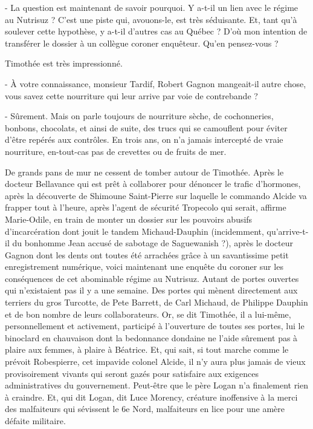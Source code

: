 - La question est maintenant de savoir pourquoi. Y a-t-il un lien avec le régime au Nutrisuz ? C’est une piste qui, avouons-le, est très séduisante. Et, tant qu’à soulever cette hypothèse, y a-t-il d’autres cas au Québec ? D’où mon intention de transférer le dossier à un collègue coroner enquêteur. Qu’en pensez-vous ?

Timothée est très impressionné.

- À votre connaissance, monsieur Tardif, Robert Gagnon mangeait-il autre chose, vous savez cette nourriture qui leur arrive par voie de contrebande ?

- Sûrement. Mais on parle toujours de nourriture sèche, de cochonneries, bonbons, chocolats, et ainsi de suite, des trucs qui se camouflent pour éviter d’être repérés aux contrôles. En trois ans, on n’a jamais intercepté de vraie nourriture, en-tout-cas pas de crevettes ou de fruits de mer.

De grands pans de mur ne cessent de tomber autour de Timothée. Après le docteur Bellavance qui est prêt à collaborer pour dénoncer le trafic d’hormones, après la découverte de Shimoune Saint-Pierre sur laquelle le commando Alcide va frapper tout à l’heure, après l’agent de sécurité Tropecolo qui serait, affirme Marie-Odile, en train de monter un dossier sur les pouvoirs abusifs d’incarcération dont jouit le tandem Michaud-Dauphin (incidemment, qu’arrive-t-il du bonhomme Jean accusé de sabotage de Saguewanish ?), après le docteur Gagnon dont les dents ont toutes été arrachées grâce à un savantissime petit enregistrement numérique, voici maintenant une enquête du coroner sur les conséquences de cet abominable régime au Nutrisuz. Autant de portes ouvertes qui n’existaient pas il y a une semaine. Des portes qui mènent directement aux terriers du gros Turcotte, de Pete Barrett, de Carl Michaud, de Philippe Dauphin et de bon nombre de leurs collaborateurs. Or, se dit Timothée, il a lui-même, personnellement et activement, participé à l’ouverture de toutes ses portes, lui le binoclard en chauvaison dont la bedonnance dondaine ne l’aide sûrement pas à plaire aux femmes, à plaire à Béatrice. Et, qui sait, si tout marche comme le prévoit Robespierre, cet impavide colonel Alcide, il n’y aura plus jamais de vieux provisoirement vivants qui seront gazés pour satisfaire aux exigences administratives du gouvernement. Peut-être que le père Logan n’a finalement rien à craindre. Et, qui dit Logan, dit Luce Morency, créature inoffensive à la merci des malfaiteurs qui sévissent le 6e Nord, malfaiteurs en lice pour une amère défaite militaire.

